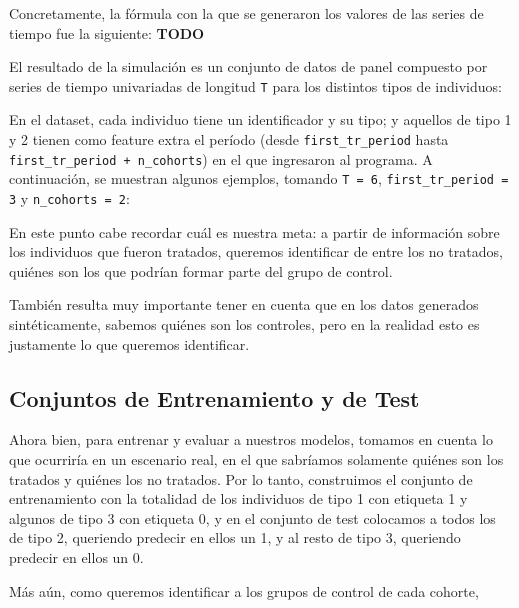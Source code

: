 \documentclass[../../main.tex]{subfiles}
\begin{document}
Concretamente, la fórmula con la que se generaron los valores de las series de tiempo
fue la siguiente: \textbf{TODO}

El resultado de la simulación es un conjunto de datos de panel compuesto por series de
tiempo univariadas de longitud \texttt{T} para los distintos tipos de individuos:


En el dataset, cada individuo tiene un identificador y su tipo; y aquellos de tipo 1 y 2
tienen como feature extra el período (desde \texttt{first\_tr\_period} hasta
\texttt{first\_tr\_period + n\_cohorts}) en el que ingresaron al programa. A continuación,
se muestran algunos ejemplos, tomando \texttt{T = 6}, \texttt{first\_tr\_period = 3} y
\texttt{n\_cohorts = 2}:

En este punto cabe recordar cuál es nuestra meta: a partir de información sobre los
individuos que fueron tratados, queremos identificar de entre los no tratados, quiénes son
los que podrían formar parte del grupo de control.

También resulta muy importante tener en cuenta que en los datos generados sintéticamente,
sabemos quiénes son los controles, pero en la realidad esto es justamente lo que queremos
identificar.

\subsection{Conjuntos de Entrenamiento y de Test}
Ahora bien, para entrenar y evaluar a nuestros modelos, tomamos en cuenta lo que ocurriría
en un escenario real, en el que sabríamos solamente quiénes son los tratados y quiénes los
no tratados. Por lo tanto, construimos el conjunto de entrenamiento con la totalidad de
los individuos de tipo 1 con etiqueta 1 y algunos de tipo 3 con etiqueta 0, y en el
conjunto de test colocamos a todos los de tipo 2, queriendo predecir en ellos un 1, y al
resto de tipo 3, queriendo predecir en ellos un 0.

Más aún, como queremos identificar a los grupos de control de cada cohorte,
\end{document}
